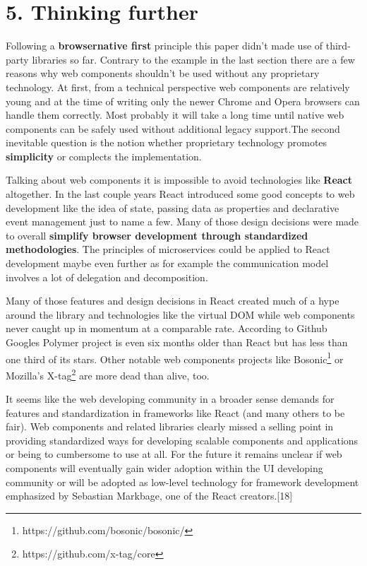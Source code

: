 \documentclass[]{article}
\begin{document}
\section{5. Thinking further}\label{thinking-further}

Following a \textbf{browsernative first} principle this paper didn't
made use of third-party libraries so far. Contrary to the example in the
last section there are a few reasons why web components shouldn't be
used without any proprietary technology. At first, from a technical
perspective web components are relatively young and at the time of
writing only the newer Chrome and Opera browsers can handle them
correctly. Most probably it will take a long time until native web
components can be safely used without additional legacy support.The
second inevitable question is the notion whether proprietary technology
promotes \textbf{simplicity} or complects the implementation.

Talking about web components it is impossible to avoid technologies like
\textbf{React} altogether. In the last couple years React introduced
some good concepts to web development like the idea of state, passing
data as properties and declarative event management just to name a few.
Many of those design decisions were made to overall \textbf{simplify
browser development through standardized methodologies}. The principles
of microservices could be applied to React development maybe even
further as for example the communication model involves a lot of
delegation and decomposition.

Many of those features and design decisions in React created much of a
hype around the library and technologies like the virtual DOM while web
components never caught up in momentum at a comparable rate. According
to Github Googles Polymer project is even six months older than React
but has less than one third of its stars. Other notable web components
projects like Bosonic\footnote{https://github.com/bosonic/bosonic/} or
Mozilla's X-tag\footnote{https://github.com/x-tag/core} are more dead
than alive, too.

It seems like the web developing community in a broader sense demands
for features and standardization in frameworks like React (and many
others to be fair). Web components and related libraries clearly missed
a selling point in providing standardized ways for developing scalable
components and applications or being to cumbersome to use at all. For
the future it remains unclear if web components will eventually gain
wider adoption within the UI developing community or will be adopted as
low-level technology for framework development emphasized by Sebastian
Markbage, one of the React creators.{[}18{]}
\end{document}

